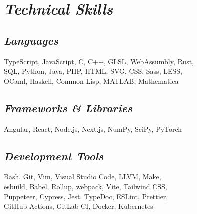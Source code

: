 \documentclass[11pt]{article}
\begin{document}
\begin{minipage}{280pt}
\section*{\it Technical Skills}
\subsection*{\it Languages}
TypeScript, JavaScript, C, C++, GLSL, WebAssumbly, Rust,\\
SQL, Python, Java, PHP, HTML, SVG, CSS, Sass, LESS,\\
OCaml, Haskell, Common Lisp, MATLAB, Mathematica

\subsection*{\it Frameworks \& Libraries}
Angular, React, Node.js, Next.js, NumPy, SciPy, PyTorch

\subsection*{\it Development Tools}
Bash, Git, Vim, Visual Studio Code, LLVM, Make,\\
esbuild, Babel, Rollup, webpack, Vite, Tailwind CSS,\\
Puppeteer, Cypress, Jest, TypeDoc, ESLint, Prettier, \\
GitHub Actions, GitLab CI, Docker, Kubernetes

\end{minipage}
\end{document}
